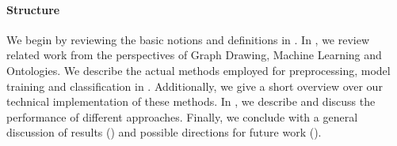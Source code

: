 \documentclass[
	fontsize=10pt, %
	twoside=false, %
	secnumdepth=1, %
  toc=indentunnumbered %
]{kaobook}
\begin{document}




\paragraph{Structure} We begin by reviewing the basic notions and definitions in
. In , we review related work from the
perspectives of Graph Drawing, Machine Learning and Ontologies.
We describe the actual methods employed for preprocessing, model training and
classification in . Additionally, we give a short overview over
our technical implementation of these methods. In ,
we describe and discuss the performance of different approaches. Finally, we
conclude with a general discussion of results () and
possible directions for future work ().









\end{document}
